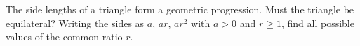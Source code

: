 The side lengths of a triangle form a geometric progression. Must the triangle be equilateral? Writing the sides as $a$, $ar$, $ar^2$ with $a>0$ and $r\ge1$, find all possible values of the common ratio $r$.
